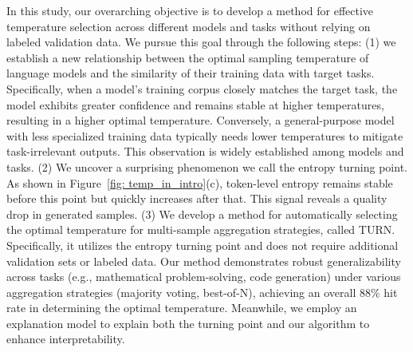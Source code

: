 In this study, our overarching objective is to develop a method for effective temperature selection across different models and tasks without relying on labeled validation data. We pursue this goal through the following steps: (1) we establish a new relationship between the optimal sampling temperature of language models and the similarity of their training data with target tasks. Specifically, when a model’s training corpus closely matches the target task, the model exhibits greater confidence and remains stable at higher temperatures, resulting in a higher optimal temperature. Conversely, a general-purpose model with less specialized training data typically needs lower temperatures to mitigate task-irrelevant outputs. This observation is widely established among models and tasks. (2) %
We uncover a surprising phenomenon we call the entropy turning point. As shown in Figure~\ref{fig: temp_in_intro}(c), token-level entropy remains stable before this point but quickly increases after that. This signal reveals a quality drop in generated samples.
(3) We develop a method for automatically selecting the optimal temperature for multi-sample aggregation strategies, called \textsc{TURN}. Specifically, it utilizes the entropy turning point and does not require additional validation sets or labeled data. Our method demonstrates robust generalizability across tasks (e.g., mathematical problem-solving, code generation) under various aggregation strategies (majority voting, best-of-N), achieving an overall \(88\%\) hit rate in determining the optimal temperature. Meanwhile, we employ an explanation model to explain both the turning point and our algorithm to enhance interpretability.

